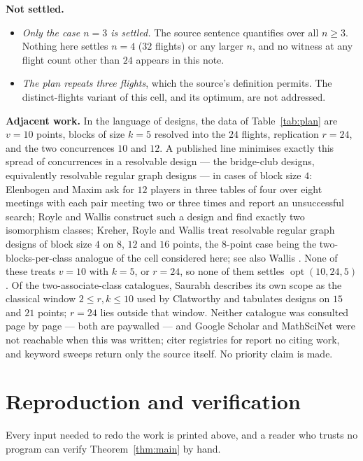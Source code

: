 \documentclass[11pt]{amsart}
\theoremstyle{remark}
\newcommand{\opt}{\operatorname{opt}}
\begin{document}
\noindent\textbf{Not settled.}
\begin{itemize}
\item \emph{Only the case $n=3$ is settled.} The source sentence quantifies
  over all $n\ge3$. Nothing here settles $n=4$ ($32$ flights) or any larger
  $n$, and no witness at any flight count other than $24$ appears in this
  note.
\item \emph{The plan repeats three flights}, which the source's definition
  permits. The distinct-flights variant of this cell, and its optimum, are not
  addressed.
\end{itemize}

\noindent\textbf{Adjacent work.} In the language of designs, the data of
Table~\ref{tab:plan} are $v=10$ points, blocks of size $k=5$ resolved into the
$24$ flights, replication $r=24$, and the two concurrences $10$ and $12$. A
published line minimises
exactly this spread of concurrences in a resolvable design --- the bridge-club
designs, equivalently resolvable regular graph designs --- in cases of block
size $4$: Elenbogen and Maxim \cite{ElenbogenMaxim} ask for $12$
players in three tables of four over eight meetings with each pair meeting two
or three times and report an unsuccessful search; Royle and Wallis
\cite{RoyleWallis} construct such a design and find exactly two isomorphism
classes; Kreher, Royle and Wallis \cite{KreherRoyleWallis} treat resolvable
regular graph designs of block size $4$ on $8$, $12$ and $16$ points, the
$8$-point case being the two-blocks-per-class analogue of the cell considered
here; see also Wallis \cite{WallisBridge,WallisRGD}. None of these treats
$v=10$ with $k=5$, or $r=24$, so none of them settles $\opt(10,24,5)$. Of the
two-associate-class catalogues, Saurabh \cite{Saurabh} describes its own scope
as the classical window $2\le r,k\le10$ used by Clatworthy \cite{Clatworthy}
and tabulates designs on $15$ and $21$ points; $r=24$ lies outside that
window. Neither catalogue was consulted page by page --- both are paywalled
--- and Google Scholar and MathSciNet were not reachable when this was
written; citer registries for \cite{SchuelerSchuermann} report no citing work,
and keyword sweeps return only the source itself. No priority claim is made.

\section{Reproduction and verification}\label{sec:repro}

Every input needed to redo the work is printed above, and a reader who trusts
no program can verify Theorem~\ref{thm:main} by hand.
\end{document}
